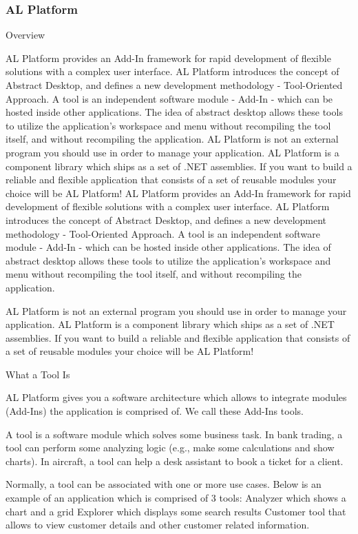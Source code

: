 \subsubsection{AL Platform}

Overview

AL Platform provides an Add-In framework for rapid development of flexible solutions with a complex user interface. AL Platform introduces the concept of Abstract Desktop, and defines a new development methodology - Tool-Oriented Approach. A tool is an independent software module - Add-In - which can be hosted inside other applications. The idea of abstract desktop allows these tools to utilize the application's workspace and menu without recompiling the tool itself, and without recompiling the application. AL Platform is not an external program you should use in order to manage your application. AL Platform is a component library which ships as a set of .NET assemblies. If you want to build a reliable and flexible application that consists of a set of reusable modules your choice will be AL Platform! 
AL Platform provides an Add-In framework for rapid development of flexible solutions with a complex user interface. AL Platform introduces the concept of Abstract Desktop, and defines a new development methodology - Tool-Oriented Approach. A tool is an independent software module - Add-In - which can be hosted inside other applications. The idea of abstract desktop allows these tools to utilize the application's workspace and menu without recompiling the tool itself, and without recompiling the application.

AL Platform is not an external program you should use in order to manage your application. AL Platform is a component library which ships as a set of .NET assemblies. If you want to build a reliable and flexible application that consists of a set of reusable modules your choice will be AL Platform! 

What a Tool Is

AL Platform gives you a software architecture which allows to integrate modules (Add-Ins) the application is comprised of. We call these Add-Ins tools.

A tool is a software module which solves some business task. In bank trading, a tool can perform some analyzing logic (e.g., make some calculations and show charts). In aircraft, a tool can help a desk assistant to book a ticket for a client.

Normally, a tool can be associated with one or more use cases. Below is an example of an application which is comprised of 3 tools:
Analyzer which shows a chart and a grid
Explorer which displays some search results
Customer tool that allows to view customer details and other customer related information.

